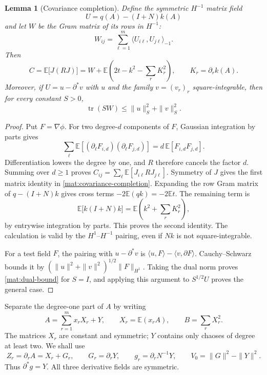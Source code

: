 \documentclass[11pt]{article}
\newtheorem{lemma}[theorem]{Lemma}
\theoremstyle{definition}
\theoremstyle{remark}
\numberwithin{equation}{section}
\begin{document}
\begin{lemma}[Covariance completion]\label{mat:covariance}
Define the symmetric $H^{-1}$ matrix field
\[
 U=q(A)-(I+N)k(A)
\]
and let $W$ be the Gram matrix of its rows in $H^{-1}$:
\[
 W_{ij}=\sum_{\ell=1}^m
       \langle U_{i\ell},U_{j\ell}\rangle_{-1}.
\]
Then
\begin{equation}\label{mat:covariance-completion}
 C=\mathbb E\bigl[J(RJ)\bigr]
   =W+\mathbb E\left(2t-k^2-\sum_r K_r^2\right),
 \qquad K_r=\partial_r k(A).
\end{equation}
Moreover, if $U=u-\partial^*v$ with $u$ and the family $v=(v_r)_r$
square-integrable, then for every constant $S>0$,
\begin{equation}\label{mat:dual-bound}
 \operatorname{tr}(SW)\le\|u\|_S^2+\|v\|_S^2.
\end{equation}
\end{lemma}

\begin{proof}
Put $F=\nabla\phi$.  For two degree-$d$ components of $F$, Gaussian
integration by parts gives
\[
 \sum_\ell\mathbb E[(\partial_\ell F_{i,d})(\partial_\ell F_{j,d})]
 =d\,\mathbb E[F_{i,d}F_{j,d}].
\]
Differentiation lowers the degree by one, and $R$ therefore cancels the
factor $d$.  Summing over $d\ge1$ proves
$C_{ij}=\sum_\ell\mathbb E[J_{i\ell}R J_{j\ell}]$.  Symmetry of $J$ gives
the first matrix identity in \eqref{mat:covariance-completion}.
Expanding the row Gram matrix of $q-(I+N)k$ gives cross terms
$-2\mathbb E(qk)=-2\mathbb E t$.  The remaining term is
\[
 \mathbb E\bigl[k(I+N)k\bigr]
   =\mathbb E\left(k^2+\sum_r K_r^2\right),
\]
by entrywise integration by parts.  This proves the second identity.
The calculation is valid by the $H^1$--$H^{-1}$ pairing, even if $Nk$
is not square-integrable.

For a test field $F$, the pairing with $u-\partial^*v$ is
$\langle u,F\rangle-\langle v,\partial F\rangle$.  Cauchy--Schwarz
bounds it by
$(\|u\|^2+\|v\|^2)^{1/2}\|F\|_{H^1}$.  Taking the dual norm proves
\eqref{mat:dual-bound} for $S=I$, and applying this argument to
$S^{1/2}U$ proves the general case.
\end{proof}

Separate the degree-one part of $A$ by writing
\begin{equation}\label{mat:chaos}
 A=\sum_{r=1}^m x_rX_r+Y,\qquad
 X_r=\mathbb E(x_rA),\qquad B=\sum_rX_r^2.
\end{equation}
The matrices $X_r$ are constant and symmetric; $Y$ contains only chaoses
of degree at least two.  We shall use
\begin{equation}\label{mat:gradient-fields}
 Z_r=\partial_rA=X_r+G_r,\qquad
 G_r=\partial_rY,\qquad
 g_r=\partial_rN^{-1}Y,
 \qquad V_0=\|G\|^2-\|Y\|^2.
\end{equation}
Thus $\partial^*g=Y$.  All three derivative fields are symmetric.
\end{document}

